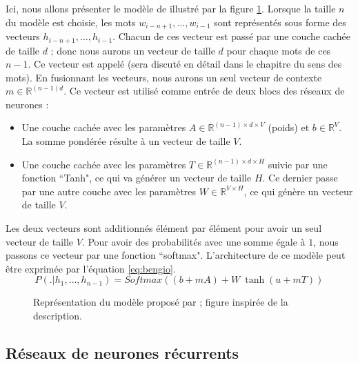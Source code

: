 \documentclass{KodeBook}
\begin{document}
Ici, nous allons présenter le modèle de \citet{2003-bengio-al} illustré par la figure \ref{fig:bengio-l}.
Lorsque la taille $n$ du modèle est choisie, les mots $w_{i-n+1}, \ldots, w_{i-1}$ sont représentés sous forme des vecteurs  $h_{i-n+1}, \ldots, h_{i-1}$. 
Chacun de ces vecteur est passé par une couche cachée de taille $d$ ; donc nous aurons un vecteur de taille $d$ pour chaque mots de ces $n-1$.
Ce vecteur est appelé  (sera discuté en détail dans le chapitre du sens des mots). 
En fusionnant les vecteurs, nous aurons un seul vecteur de contexte $m \in \mathbb{R}^{(n-1) d}$.
Ce vecteur est utilisé comme entrée de deux blocs des réseaux de neurones :
\begin{itemize}
	\item Une couche cachée avec les paramètres $A \in \mathbb{R}^{(n-1) \times d \times V}$ (poids) et $b \in \mathbb{R}^{V}$. 
	La somme pondérée résulte à un vecteur de taille $V$. 
	\item Une couche cachée avec les paramètres $T \in \mathbb{R}^{(n-1) \times d \times H}$ suivie par une fonction ``Tanh", ce qui va générer un vecteur de taille $H$. 
	Ce dernier passe par une autre couche avec les paramètres $W \in \mathbb{R}^{V \times H}$, ce qui génère un vecteur de taille $V$. 
\end{itemize}
Les deux vecteurs sont additionnés élément par élément pour avoir un seul vecteur de taille $V$. 
Pour avoir des probabilités avec une somme égale à $1$, nous passons ce vecteur par une fonction ``softmax". 
L'architecture de ce modèle peut être exprimée par l'équation \ref{eq:bengio}.
\begin{equation}
	P(.|h_1,\ldots, h_{n-1}) = 
	Softmax \left(
	(b + m A) 
	+ 
	W\ \tanh(u + m T)
	\right)
	\label{eq:bengio}
\end{equation}

\begin{figure}[ht]
	\centering
	\caption[Modèle de langage à base des réseaux de neurones à propagation avant]{Représentation du modèle proposé par \citet{2003-bengio-al} ; figure inspirée de la description.}
	\label{fig:bengio-l}
\end{figure}

\subsection{Réseaux de neurones récurrents}
\end{document}
